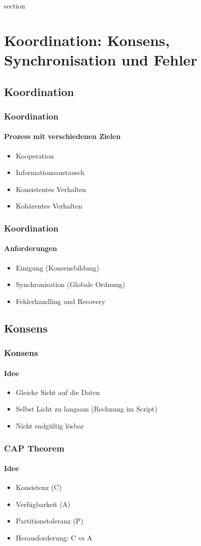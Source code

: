 section\section{Koordination: Konsens, Synchronisation und Fehler}
\subsection{Koordination}
\begin{frame}
  \frametitle{Koordination}
  \framesubtitle{Prozess mit verschiedenen Zielen}
  \begin{itemize}
    \item Kooperation
    \item Informationsaustausch
    \item Konsistentes Verhalten 
    \item Kohärentes Verhalten
  \end{itemize}
\end{frame}

\begin{frame}
  \frametitle{Koordination}
  \framesubtitle{Anforderungen}
  \begin{itemize}
    \item Einigung (Konsensbildung)
    \item Synchronisation (Globale Ordnung)
    \item Fehlerhandling und Recovery
  \end{itemize}
\end{frame}

\subsection{Konsens}
\begin{frame}
  \frametitle{Konsens}
  \framesubtitle{Idee}
  \begin{itemize}
    \item Gleiche Sicht auf die Daten
    \item Selbst Licht zu langsam (Rechnung im Script)
    \item Nicht endgültig lösbar
  \end{itemize}
\end{frame}


\begin{frame}
  \frametitle{CAP Theorem}
  \framesubtitle{Idee}
  \begin{itemize}
    \item Konsistenz (C)
    \item Verfügbarkeit (A)
    \item Partitionstoleranz (P)
    \item Herausforderung: C vs A
  \end{itemize}
\end{frame}

